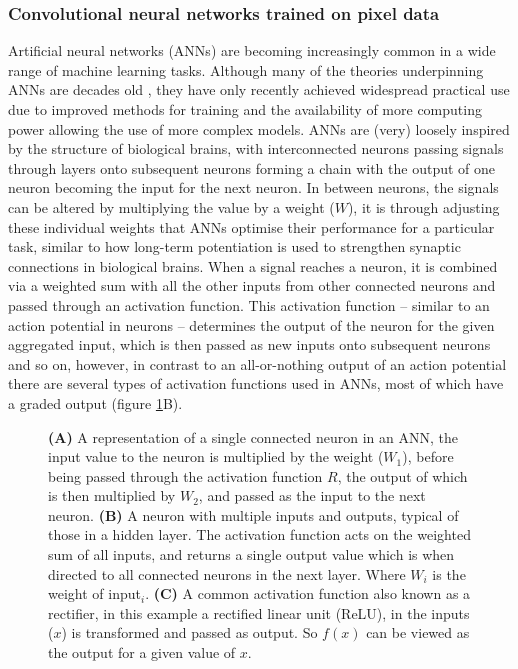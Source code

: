 \documentclass[a4paper,11pt,twoside,openright]{scrbook}
\begin{document}
\subsubsection{Convolutional neural networks trained on pixel data}
Artificial neural networks (ANNs) are becoming increasingly common in a wide range of machine learning tasks.
Although many of the theories underpinning ANNs are decades old \cite{perceptron_paper}, they have only recently achieved widespread practical use due to improved methods for training \cite{Rumelhart1986} and the availability of more computing power allowing the use of more complex models.
ANNs are (very) loosely inspired by the structure of biological brains, with interconnected neurons passing signals through layers onto subsequent neurons forming a chain with the output of one neuron becoming the input for the next neuron.
In between neurons, the signals can be altered by multiplying the value by a weight ($W$), it is through adjusting these individual weights that ANNs optimise their performance for a particular task, similar to how long-term potentiation is used to strengthen synaptic connections in biological brains.
When a signal reaches a neuron, it is combined via a weighted sum with all the other inputs from other connected neurons and passed through an activation function.
This activation function -- similar to an action potential in neurons -- determines the output of the neuron for the given aggregated input, which is then passed as new inputs onto subsequent neurons and so on, however, in contrast to an all-or-nothing output of an action potential there are several types of activation functions used in ANNs, most of which have a graded output (figure \ref{figure:neuron_relu}B).

\begin{figure}
    \captionsetup{width=0.8\textwidth}
    \caption[Diagram neural network neuron and activation function.]{\textbf{(A)} A representation of a single connected neuron in an ANN, the input value to the neuron is multiplied by the weight ($W_1$), before being passed through the activation function $R$, the output of which is then multiplied by $W_2$, and passed as the input to the next neuron. \textbf{(B)} A neuron with multiple inputs and outputs, typical of those in a hidden layer. The activation function acts on the weighted sum of all inputs, and returns a single output value which is when directed to all connected neurons in the next layer. Where $W_i$ is the weight of \textsf{input}$_i$. \textbf{(C)} A common activation function also known as a rectifier, in this example a rectified linear unit (ReLU), in the inputs ($x$) is transformed and passed as output. So $f(x)$ can be viewed as the output for a given value of $x$.}
    \label{figure:neuron_relu}

\end{figure}
\end{document}
